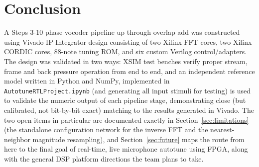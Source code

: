 \documentclass[conference,a4paper]{IEEEtran}
\begin{document}
\section{Conclusion}
\label{sec:conclusion}
A Steps 3-10 phase vocoder pipeline up through overlap add was constructed using
Vivado IP-Integrator design consisting of two Xilinx FFT cores, two Xilinx CORDIC cores,
88-note tuning ROM, and six custom Verilog control/adapters. The design was validated in
two ways: XSIM test benches verify proper stream, frame and back pressure operation from
end to end, and an independent reference model written in Python and NumPy,
implemented in \texttt{AutotuneRTLProject.ipynb} (and generating all input stimuli for testing)
is used to validate the numeric output of each pipeline stage, demonstrating close (but
calibrated, not bit-by-bit exact) matching to the results generated in Vivado. The two open
items in particular are documented exactly in Section~\ref{sec:limitations} (the standalone
configuration network for the inverse FFT and the nearest-neighbor magnitude
resampling), and Section~\ref{sec:future} maps the route from here to the final goal of
real-time, live microphone autotune using FPGA, along with the general DSP platform
directions the team plans to take.
\end{document}
